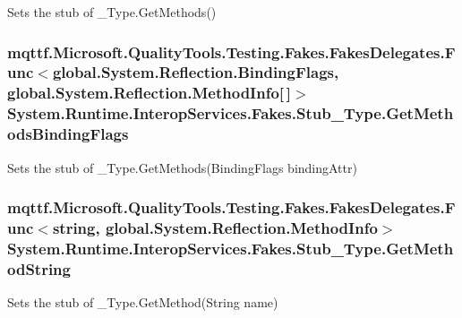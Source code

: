 Sets the stub of \-\_\-\-Type.\-Get\-Methods()

\hypertarget{class_system_1_1_runtime_1_1_interop_services_1_1_fakes_1_1_stub___type_af4016b89ad29bd735f217324605f6ba5}{
\subsubsection[{Get\-Methods\-Binding\-Flags}]{\setlength{\rightskip}{0pt plus 5cm}mqttf.\-Microsoft.\-Quality\-Tools.\-Testing.\-Fakes.\-Fakes\-Delegates.\-Func$<$global.\-System.\-Reflection.\-Binding\-Flags, global.\-System.\-Reflection.\-Method\-Info\mbox{[}$\,$\mbox{]}$>$ System.\-Runtime.\-Interop\-Services.\-Fakes.\-Stub\-\_\-\-Type.\-Get\-Methods\-Binding\-Flags}}\label{class_system_1_1_runtime_1_1_interop_services_1_1_fakes_1_1_stub___type_af4016b89ad29bd735f217324605f6ba5}


Sets the stub of \-\_\-\-Type.\-Get\-Methods(\-Binding\-Flags binding\-Attr)

\hypertarget{class_system_1_1_runtime_1_1_interop_services_1_1_fakes_1_1_stub___type_ab84315e4f9984ae96b469eaf990d3b72}{
\subsubsection[{Get\-Method\-String}]{\setlength{\rightskip}{0pt plus 5cm}mqttf.\-Microsoft.\-Quality\-Tools.\-Testing.\-Fakes.\-Fakes\-Delegates.\-Func$<$string, global.\-System.\-Reflection.\-Method\-Info$>$ System.\-Runtime.\-Interop\-Services.\-Fakes.\-Stub\-\_\-\-Type.\-Get\-Method\-String}}\label{class_system_1_1_runtime_1_1_interop_services_1_1_fakes_1_1_stub___type_ab84315e4f9984ae96b469eaf990d3b72}


Sets the stub of \-\_\-\-Type.\-Get\-Method(\-String name)

